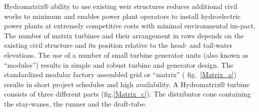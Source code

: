 Hydromatrix$\circledR$ ability to use existing weir structures reduces additional civil works to minimum and enables power plant operators to install hydroelectric power plants at extremely competitive costs with minimal environmental im-pact. The number of matrix turbines and their arrangement in rows depends on the existing civil structure and its position relative to the head- and tail-water elevations. The use of a number of small turbine generator units (also known as “modules”) results in simple and robust turbine and generator design. The standardized modular factory assembled grid or “matrix” ( fig.~\ref{Matrix_a}) results in short project schedules and high availability. A Hydromatrix$\circledR$ turbine consists of three different parts (fig.\ref{Matrix_c}). The distributor cone containing the stay-wanes, the runner and the draft-tube.



